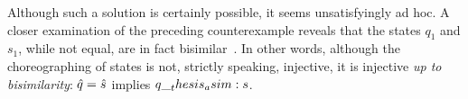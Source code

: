 
Although such a solution is certainly possible, it seems unsatisfyingly ad hoc.
A closer examination of the preceding counterexample reveals that the states $q_1$ and $s_1$, while not equal, are in fact bisimilar~.
In other words, although the choreographing of states is not, strictly speaking, injective, it is injective \emph{up to bisimilarity}: $\hat{q} = \hat{s}$ implies $q \__thesis_asim: s$.



